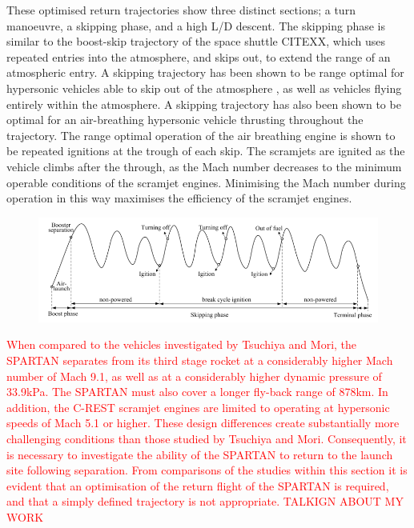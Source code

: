 These optimised return trajectories show three distinct sections; a turn manoeuvre, a skipping phase, and a high L/D descent. The skipping phase is similar to the boost-skip trajectory of the space shuttle CITEXX, which uses repeated entries into the atmosphere, and skips out, to extend the range of an atmospheric entry. A skipping trajectory has been shown to be range optimal for hypersonic vehicles able to skip out of the atmosphere \cite{Moshman2014}, as well as vehicles flying entirely within the atmosphere\cite{Moshman2014,Darby2011}. A skipping trajectory has also been shown to be optimal for an air-breathing hypersonic vehicle thrusting throughout the trajectory\cite{Chai2015}. The range optimal operation of the air breathing engine is shown to be repeated ignitions at the trough of each skip. The scramjets are ignited as the vehicle climbs after the through, as the Mach number decreases to the minimum operable conditions of the scramjet engines. Minimising the Mach number during operation in this way maximises the efficiency of the scramjet engines.

\begin{figure}
\centering
\includegraphics[width=0.9\linewidth]{"figures/2_literature-review/chai-boost skip"}
\caption{}
\label{fig:chai-boostskip}
\end{figure}

\textcolor{red}{
When compared to the vehicles investigated by Tsuchiya and Mori\cite{Tsuchiya2005}, the SPARTAN separates from its third stage rocket at a considerably higher Mach number of Mach 9.1, as well as at a considerably higher dynamic pressure of 33.9kPa. The SPARTAN must also cover a longer fly-back range of 878km. In addition, the C-REST scramjet engines are limited to operating at hypersonic speeds of Mach 5.1 or higher. These design differences create substantially more challenging conditions than those studied by Tsuchiya and Mori. Consequently, it is necessary to investigate the ability of the SPARTAN to return to the launch site following separation. From comparisons of the studies within this section it is evident that an optimisation of the return flight of the SPARTAN is required, and that a simply defined trajectory is not appropriate. TALKIGN ABOUT MY WORK}

